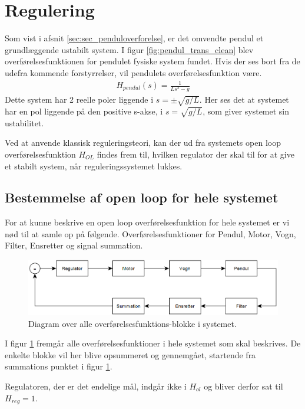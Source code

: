 \section{Regulering}\label{sec:regulering}

Som vist i afsnit \ref{sec:sec_penduloverforelse}, er det omvendte pendul et grundlæggende ustabilt system.
I figur \ref{fig:pendul_trans_clean} blev overførelsesfunktionen for pendulet fysiske system fundet.
Hvis der ses bort fra de udefra kommende forstyrrelser, vil pendulets overførelsesfunktion være.
\begin{align}
H_{pendul}(s) = \frac{1}{Ls^2 - g} \label{eq:h_pendul}
\end{align} 
Dette system har 2 reelle poler liggende i $s = \pm\sqrt{g/L}$.
Her ses det at systemet har en pol liggende på den positive s-akse, i $s = \sqrt{g/L}$, som giver systemet sin ustabilitet.

Ved at anvende klassisk reguleringsteori, kan der ud fra systemets open loop overførelsesfunktion $H_{OL}$ findes frem til, hvilken regulator der skal til for at give et stabilt system, når reguleringssystemet lukkes.   

\subsection{Bestemmelse af open loop for hele systemet}
For at kunne beskrive en open loop overførelsesfunktion for hele systemet er vi nød til at samle op på følgende.
Overførelsesfunktioner for Pendul, Motor, Vogn, Filter, Ensretter og signal summation.
\begin{figure}[h!]
	\centering
	\includegraphics[width=.8\textwidth]{billeder/reg_diagram.png}
	\caption{Diagram over alle overførelsesfunktions-blokke i systemet.}
	\label{fig:reg_diagram}
\end{figure}
\FloatBlock 

I figur \ref{fig:reg_diagram} fremgår alle overførelsesfunktioner i hele systemet som skal beskrives.
De enkelte blokke vil her blive opsummeret og gennemgået, startende fra summations punktet i figur \ref{fig:reg_diagram}.

Regulatoren, der er det endelige mål, indgår ikke i $H_{ol}$ og bliver derfor sat til $H_{reg} = 1$.   

